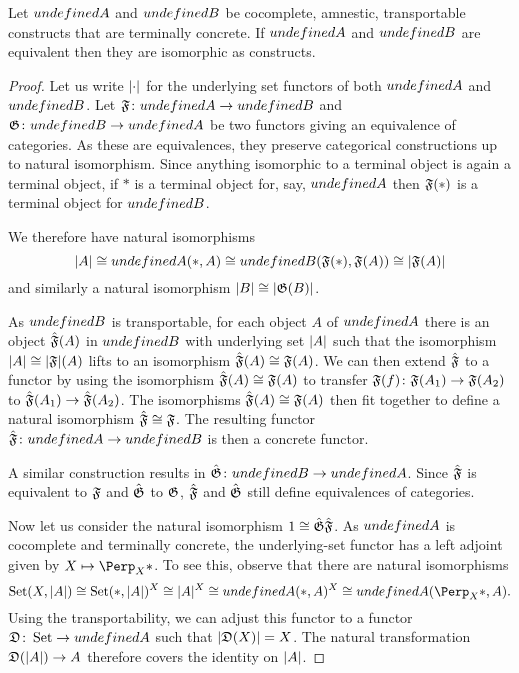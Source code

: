 \documentclass[%
a4paper,%
arxiv,%
defaults
]{myclass}
\begin{document}
\begin{proposition}
Let \(\m{A}\) and \(\m{B}\) be cocomplete, amnestic, transportable constructs that are terminally concrete.
If \(\m{A}\) and \(\m{B}\) are equivalent then they are isomorphic as constructs.
\end{proposition}

\begin{proof}
Let us write \(\lvert \cdot \rvert\) for the underlying set functors of both \(\m{A}\) and \(\m{B}\).
Let \(\func{F} \colon \m{A} \to \m{B}\) and \(\func{G} \colon \m{B} \to \m{A}\) be two functors giving an equivalence of categories.
As these are equivalences, they preserve categorical constructions up to natural isomorphism.
Since anything isomorphic to a terminal object is again a terminal object, if \(*\) is a terminal object for, say, \(\m{A}\) then \(\func{F}(*)\) is a terminal object for \(\m{B}\).

We therefore have natural isomorphisms
%
\[
  \sabs{A} \cong \m{A}(*, A) \cong \m{B}(\func{F}(*), \func{F}(A)) \cong \sabs{\func{F}(A)}
\]
%
and similarly a natural isomorphism \(\sabs{B} \cong \sabs{\func{G}(B)}\).

As \(\m{B}\) is transportable, for each object \(A\) of \(\m{A}\) there is an object \(\hat{\func{F}}(A)\) in \(\m{B}\) with underlying set \(\lvert A \rvert\) such that the isomorphism \(\sabs{A} \cong \sabs{\func{F}}(A)\) lifts to an isomorphism \(\hat{\func{F}}(A) \cong \func{F}(A)\).
We can then extend \(\hat{\func{F}}\) to a functor by using the isomorphism \(\hat{\func{F}}(A) \cong \func{F}(A)\) to transfer \(\func{F}(f) \colon \func{F}(A_1) \to \func{F}(A_2)\) to \(\hat{\func{F}}(A_1) \to \hat{\func{F}}(A_2)\).
The isomorphisms \(\hat{\func{F}}(A) \cong \func{F}(A)\) then fit together to define a natural isomorphism \(\hat{\func{F}} \cong \func{F}\).
The resulting functor \(\hat{\func{F}}\colon \m{A} \to \m{B}\) is then a concrete functor.

A similar construction results in \(\hat{\func{G}} \colon \m{B} \to \m{A}\).
Since \(\hat{\func{F}}\) is equivalent to \(\func{F}\) and \(\hat{\func{G}}\) to \(\func{G}\), \(\hat{\func{F}}\) and \(\hat{\func{G}}\) still define equivalences of categories.

Now let us consider the natural isomorphism \(1 \cong \hat{\func{G}}\hat{\func{F}}\).
As \(\m{A}\) is cocomplete and terminally concrete, the underlying\hyp{}set functor has a left adjoint given by \(X \mapsto \scoprod_X *\).
To see this, observe that there are natural isomorphisms
%
\[
  \Set(X, \sabs{A}) \cong \Set(*, \sabs{A})^X \cong \sabs{A}^X \cong \m{A}(*, A)^X \cong \m{A}(\scoprod_X *, A).
\]
%
Using the transportability, we can adjust this functor to a functor \(\func{D} \colon \Set \to \m{A}\) such that \(\sabs{\func{D}(X)} = X\).
The natural transformation \(\func{D}(\sabs{A}) \to A\) therefore covers the identity on \(\lvert A \rvert\).


\end{proof}
\end{document}
